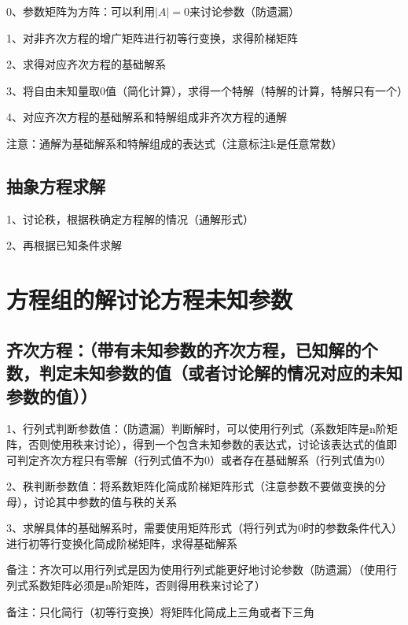 0、参数矩阵为方阵：可以利用$ |A| = 0 $来讨论参数（防遗漏）

1、对非齐次方程的增广矩阵进行初等行变换，求得阶梯矩阵

2、求得对应齐次方程的基础解系

3、将自由未知量取0值（简化计算），求得一个特解（特解的计算，特解只有一个）

4、对应齐次方程的基础解系和特解组成非齐次方程的通解

注意：通解为基础解系和特解组成的表达式（注意标注k是任意常数）



\subsection{抽象方程求解}

1、讨论秩，根据秩确定方程解的情况（通解形式）

2、再根据已知条件求解

\section{方程组的解讨论方程未知参数}



\subsection{齐次方程：（带有未知参数的齐次方程，已知解的个数，判定未知参数的值（或者讨论解的情况对应的未知参数的值））}

1、行列式判断参数值：（防遗漏）判断解时，可以使用行列式（系数矩阵是n阶矩阵，否则使用秩来讨论），得到一个包含未知参数的表达式，讨论该表达式的值即可判定齐次方程只有零解（行列式值不为0）或者存在基础解系（行列式值为0）

2、秩判断参数值：将系数矩阵化简成阶梯矩阵形式（注意参数不要做变换的分母），讨论其中参数的值与秩的关系

3、求解具体的基础解系时，需要使用矩阵形式（将行列式为0时的参数条件代入）进行初等行变换化简成阶梯矩阵，求得基础解系

备注：齐次可以用行列式是因为使用行列式能更好地讨论参数（防遗漏）（使用行列式系数矩阵必须是n阶矩阵，否则得用秩来讨论了）

备注：只化简行（初等行变换）将矩阵化简成上三角或者下三角



